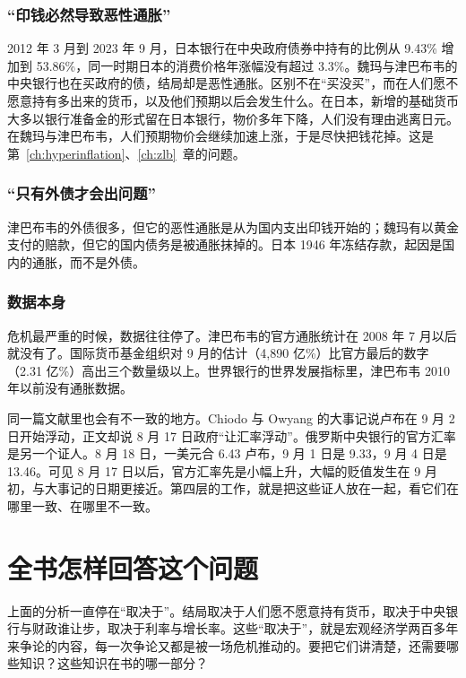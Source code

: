 \subsubsection{“印钱必然导致恶性通胀”}
2012 年 3 月到 2023 年 9 月，日本银行在中央政府债券中持有的比例从 9.43\% 增加到 53.86\%\cite{boj2026ff}，同一时期日本的消费价格年涨幅没有超过 3.3\%\cite{wdi2026}。魏玛与津巴布韦的中央银行也在买政府的债，结局却是恶性通胀。区别不在“买没买”，而在人们愿不愿意持有多出来的货币，以及他们预期以后会发生什么。在日本，新增的基础货币大多以银行准备金的形式留在日本银行，物价多年下降，人们没有理由逃离日元。在魏玛与津巴布韦，人们预期物价会继续加速上涨，于是尽快把钱花掉。这是第~\ref{ch:hyperinflation}、\ref{ch:zlb}~章的问题。

\subsubsection{“只有外债才会出问题”}
津巴布韦的外债很多，但它的恶性通胀是从为国内支出印钱开始的；魏玛有以黄金支付的赔款，但它的国内债务是被通胀抹掉的。日本 1946 年冻结存款，起因是国内的通胀，而不是外债。

\subsubsection{数据本身}
危机最严重的时候，数据往往停了。津巴布韦的官方通胀统计在 2008 年 7 月以后就没有了。国际货币基金组织对 9 月的估计（4,890 亿\%）比官方最后的数字（2.31 亿\%）高出三个数量级以上\cite{koech2011}。世界银行的世界发展指标里，津巴布韦 2010 年以前没有通胀数据\cite{wdi2026}。

同一篇文献里也会有不一致的地方。Chiodo 与 Owyang 的大事记说卢布在 9 月 2 日开始浮动，正文却说 8 月 17 日政府“让汇率浮动”\cite{chiodo2002}。俄罗斯中央银行的官方汇率是另一个证人。8 月 18 日，一美元合 6.43 卢布，9 月 1 日是 9.33，9 月 4 日是 13.46\cite{cbr2026}。可见 8 月 17 日以后，官方汇率先是小幅上升，大幅的贬值发生在 9 月初，与大事记的日期更接近。第四层的工作，就是把这些证人放在一起，看它们在哪里一致、在哪里不一致。

\section{全书怎样回答这个问题}\label{sec:intro-map}

上面的分析一直停在“取决于”。结局取决于人们愿不愿意持有货币，取决于中央银行与财政谁让步，取决于利率与增长率。这些“取决于”，就是宏观经济学两百多年来争论的内容，每一次争论又都是被一场危机推动的。要把它们讲清楚，还需要哪些知识？这些知识在书的哪一部分？

